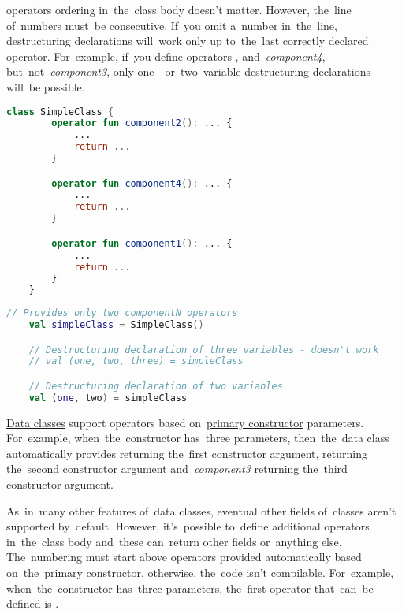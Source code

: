 \noindent {} operators ordering in~the~class body doesn't matter.
However, the~line of~numbers must~be consecutive.
If~you omit a~number in~the~line, destructuring declarations will~work only up to~the~last correctly declared operator.
For~example, if~you define operators ,  \mbox{and \textit{component4}}, \mbox{but not \textit{component3}}, only one--~or~two--variable destructuring declarations will~be possible.

\example
\begin{lstlisting}[language=Kotlin, title={Class with \textit{componentN} operators jumbled and \textit{component3} missing}]
    class SimpleClass {
        operator fun component2(): ... {
            ...
            return ...
        }

        operator fun component4(): ... {
            ...
            return ...
        }

        operator fun component1(): ... {
            ...
            return ...
        }
    }
\end{lstlisting}
\begin{lstlisting}[language=Kotlin, title={Destructuring declaration behavior}]
    // Provides only two componentN operators
    val simpleClass = SimpleClass()

    // Destructuring declaration of three variables - doesn't work
    // val (one, two, three) = simpleClass

    // Destructuring declaration of two variables
    val (one, two) = simpleClass
\end{lstlisting}
\newpage

\hyperref[kotlindataclass]{Data classes} support  operators based on~\hyperref[kotlinprimaryconstructor]{primary constructor} parameters.
For~example, when~the~constructor has~three parameters, then~the~data class automatically provides  returning the~first constructor argument,  returning the~second constructor argument \mbox{and \textit{component3}} returning the~third constructor argument.

As~in~many other features of~data classes, eventual other fields of~classes aren't supported by~default.
However, it's~possible to~define additional  operators in~the~class body and~these can~return other fields or~anything else.
The~numbering must start above operators provided automatically based on~the~primary constructor, otherwise, the~code isn't compilable.
For~example, when~the~constructor has~three parameters, the~first operator that~can~be defined is .
\newline

